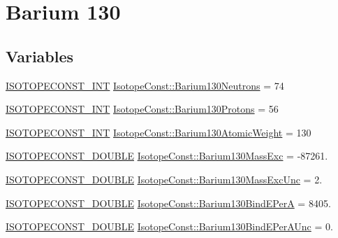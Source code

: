 \hypertarget{group___isotope_const-_barium-_ba130}{}\section{Barium 130}
\label{group___isotope_const-_barium-_ba130}
\subsection*{Variables}
\begin{DoxyCompactItemize}
\item 
\mbox{\hyperlink{group___isotope_const-_macros_ga5f18360b3e99483a35c32d789e62621c}{I\+S\+O\+T\+O\+P\+E\+C\+O\+N\+S\+T\+\_\+\+I\+NT}} \mbox{\hyperlink{group___isotope_const-_barium-_ba130_ga9d125ba7913873a0b5a975f4c5cfa9cb}{Isotope\+Const\+::\+Barium130\+Neutrons}} = 74
\item 
\mbox{\hyperlink{group___isotope_const-_macros_ga5f18360b3e99483a35c32d789e62621c}{I\+S\+O\+T\+O\+P\+E\+C\+O\+N\+S\+T\+\_\+\+I\+NT}} \mbox{\hyperlink{group___isotope_const-_barium-_ba130_gab4294f6e02c6f4bd10a8fbc347e9651d}{Isotope\+Const\+::\+Barium130\+Protons}} = 56
\item 
\mbox{\hyperlink{group___isotope_const-_macros_ga5f18360b3e99483a35c32d789e62621c}{I\+S\+O\+T\+O\+P\+E\+C\+O\+N\+S\+T\+\_\+\+I\+NT}} \mbox{\hyperlink{group___isotope_const-_barium-_ba130_gaa74ac1bf68da2c93698c091feb49fe19}{Isotope\+Const\+::\+Barium130\+Atomic\+Weight}} = 130
\item 
\mbox{\hyperlink{group___isotope_const-_macros_ga8f45a7272ce02c0b4c65c44636ed719a}{I\+S\+O\+T\+O\+P\+E\+C\+O\+N\+S\+T\+\_\+\+D\+O\+U\+B\+LE}} \mbox{\hyperlink{group___isotope_const-_barium-_ba130_ga09020dbb8cabb4009ce63230ed5e46fc}{Isotope\+Const\+::\+Barium130\+Mass\+Exc}} = -\/87261.
\item 
\mbox{\hyperlink{group___isotope_const-_macros_ga8f45a7272ce02c0b4c65c44636ed719a}{I\+S\+O\+T\+O\+P\+E\+C\+O\+N\+S\+T\+\_\+\+D\+O\+U\+B\+LE}} \mbox{\hyperlink{group___isotope_const-_barium-_ba130_gaa2167772cc326adfa70b6d36c7ab5cab}{Isotope\+Const\+::\+Barium130\+Mass\+Exc\+Unc}} = 2.
\item 
\mbox{\hyperlink{group___isotope_const-_macros_ga8f45a7272ce02c0b4c65c44636ed719a}{I\+S\+O\+T\+O\+P\+E\+C\+O\+N\+S\+T\+\_\+\+D\+O\+U\+B\+LE}} \mbox{\hyperlink{group___isotope_const-_barium-_ba130_ga17a482fa38568368e2b15c01609c152e}{Isotope\+Const\+::\+Barium130\+Bind\+E\+PerA}} = 8405.
\item 
\mbox{\hyperlink{group___isotope_const-_macros_ga8f45a7272ce02c0b4c65c44636ed719a}{I\+S\+O\+T\+O\+P\+E\+C\+O\+N\+S\+T\+\_\+\+D\+O\+U\+B\+LE}} \mbox{\hyperlink{group___isotope_const-_barium-_ba130_ga13fa12be9ce1701e7cfc891115538051}{Isotope\+Const\+::\+Barium130\+Bind\+E\+Per\+A\+Unc}} = 0.

\end{DoxyCompactItemize}
